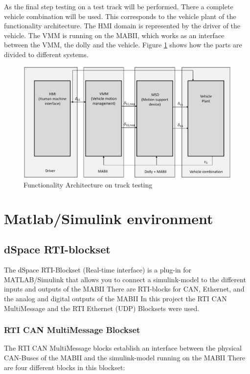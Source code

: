 \documentclass[ExampleMasters.tex]{subfiles}
\begin{document}
As the final step testing on a test track will be performed. There a complete vehicle combination will be used. This corresponds to the vehicle plant of the functionality architecture. The \gls{HMI} domain is represented by the driver of the vehicle. The \gls{VMM} is running on the \gls{MABII}, which works as an interface between the \gls{VMM}, the dolly and the vehicle. Figure \ref{fig:funct_architecture_track} shows how the parts are divided to different systems.
\begin{figure}[h]
	\centering
	\includegraphics[width=0.5\linewidth]{figures/functionality_architecture_track}
	
	\caption{Functionality Architecture on track testing}
	\label{fig:funct_architecture_track}
\end{figure}          

\section{Matlab/Simulink environment}
\label{sec:matlab}




\subsection{dSpace RTI-blockset}
\label{dSpace_RTI}
The dSpace RTI-Blockset (Real-time interface) is a plug-in for MATLAB/Simulink that allows you to connect a simulink-model to the different inputs and outputs of the \gls{MABII} There are \gls{RTI}-blocks for CAN, Ethernet, and the analog and digital outputs of the \gls{MABII}
In this project the \gls{RTI} \gls{CAN} MultiMessage and the \gls{RTI} Ethernet (UDP) Blocksets were used.\\ 
\subsubsection{RTI \gls{CAN} MultiMessage Blockset}
The \gls{RTI} \gls{CAN} MultiMessage blocks establish an interface between the physical \gls{CAN}-Buses of the \gls{MABII} and the simulink-model running on the \gls{MABII} There are four different blocks in this blockset: 
\end{document}
